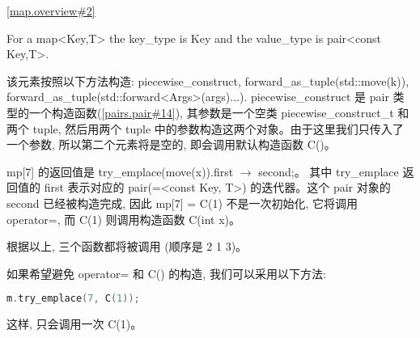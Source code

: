 \documentclass{article}
\begin{document}
	\href{https://timsong-cpp.github.io/cppwp/n4659/map.overview#2}{[map.overview\#2]}
	\begin{lightgrayleftbar}
		For a map<Key,T> the key\_­type is Key and the value\_­type is pair<const Key,T>.
	\end{lightgrayleftbar}

	该元素按照以下方法构造: piecewise\_­construct, forward\_­as\_­tuple(std​::​move(k)), forward\_­as\_­tuple(std​::​forward<Args>(args)...). piecewise\_construct 是 pair 类型的一个构造函数(\href{https://timsong-cpp.github.io/cppwp/n4659/pairs.pair#14}{[pairs.pair\#14]}), 其参数是一个空类 piecewise\_construct\_t 和两个 tuple, 然后用两个 tuple 中的参数构造这两个对象。由于这里我们只传入了一个参数, 所以第二个元素将是空的, 即会调用默认构造函数 C()。
	
	mp[7] 的返回值是 try\_­emplace(move(x)).first $\to$ second;。 其中 try\_emplace 返回值的 first 表示对应的 pair(=<const Key, T>) 的迭代器。这个 pair 对象的 second 已经被构造完成, 因此 mp[7] = C(1) 不是一次初始化, 它将调用 operator=, 而 C(1) 则调用构造函数 C(int x)。
	
	根据以上, 三个函数都将被调用 (顺序是 2 1 3)。
	
	如果希望避免 operator= 和 C() 的构造, 我们可以采用以下方法:
	
	\begin{lstlisting}[language=C++]
m.try_emplace(7, C(1));
	\end{lstlisting}

	这样, 只会调用一次 C(1)。
\end{document}
